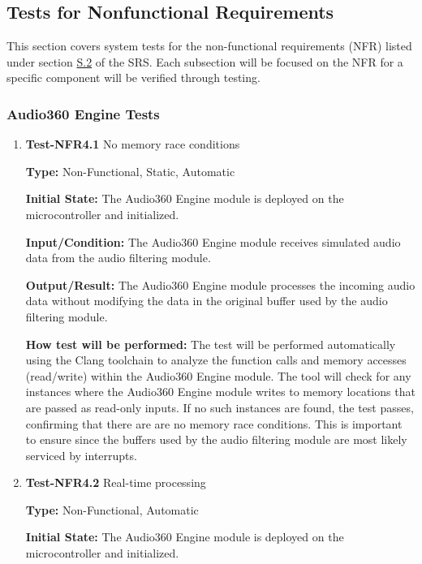 \documentclass[12pt, titlepage]{article}
\begin{document}
\subsection{Tests for Nonfunctional Requirements}

This section covers system tests for the non-functional requirements (NFR) 
listed under section \hyperref[SRS-sec:S.2]{S.2} of the SRS. Each subsection 
will be focused on the NFR for a specific component will be verified through 
testing.

\subsubsection{Audio360 Engine Tests}

\begin{enumerate}
\item{\textbf{Test-NFR4.1} No memory race conditions\\}

\textbf{Type:} Non-Functional, Static, Automatic

\textbf{Initial State:}
The Audio360 Engine module is deployed on the microcontroller and initialized.

\textbf{Input/Condition:}
The Audio360 Engine module receives simulated audio data from the audio
filtering module.

\textbf{Output/Result:}
The Audio360 Engine module processes the incoming audio data without modifying
the data in the original buffer used by the audio filtering module. 

\textbf{How test will be performed:}
The test will be performed automatically using the Clang toolchain
to analyze the function calls and memory accesses (read/write) within the Audio360
Engine module. The tool will check for any instances where the Audio360
Engine module writes to memory locations that are passed as read-only inputs. 
If no such instances are found, the test passes, confirming that there are
are no memory race conditions. This is important to ensure since the buffers
used by the audio filtering module are most likely serviced by interrupts. 

\item{\textbf{Test-NFR4.2} Real-time processing\\}

\textbf{Type:} Non-Functional, Automatic

\textbf{Initial State:}
The Audio360 Engine module is deployed on the microcontroller and initialized.


\end{enumerate}
\end{document}
